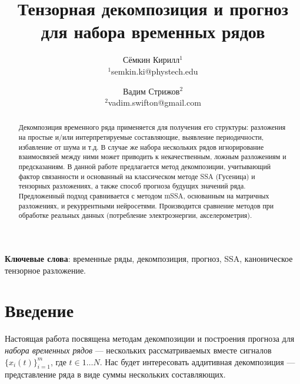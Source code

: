 
\usepackage[backend=biber, sorting=none]{biblatex}
\usepackage{subfigure}



\theoremstyle{definition}
\newtheorem*{Def}{Определение}
\theoremstyle{plain}
\newtheorem{Lem}{Лемма}
\newtheorem{Th}{Теорема}

\newcommand{\delayV}[1]{\overset{\leftarrow}{\mathbf{x}}_{#1}}
\newcommand{\delayM}[1]{\overset{\leftarrow}{\mathbf{X}}_{#1}}

\title{Тензорная декомпозиция и прогноз для набора временных рядов}
\author{Сёмкин Кирилл$^{1}$ \\ {\footnotesize $^{1}$semkin.ki@phystech.edu} \and Вадим Стрижов$^{2}$ \\ {\footnotesize $^{2}$vadim.swifton@gmail.com}}
\date{}



	
	\maketitle
	
	\begin{abstract}
		
		Декомпозиция временного ряда применяется для получения его структуры: разложения на простые и/или интерпретируемые составляющие, выявление периодичности, избавление от шума и т.д. В случае же набора нескольких рядов игнорирование взаимосвязей между ними может приводить к некачественным, ложным разложениям и предсказаниям. В данной работе предлагается метод декомпозиции, учитывающий фактор связанности и основанный на классическом методе SSA (Гусеница) и тензорных разложениях, а также способ прогноза будущих значений ряда. Предложенный подход сравнивается с методом mSSA, основанным на матричных разложениях, и рекуррентными нейросетями. Производится сравнение методов при обработке реальных данных (потребление электроэнергии, акселерометрия).
		
	\end{abstract}
	
	\textbf{Ключевые слова}: {\small временные ряды, декомпозиция, прогноз, SSA, каноническое тензорное разложение}.
	
	
	\section{Введение}\label{Intro}
	
		Настоящая работа посвящена методам декомпозиции и построения прогноза для \textit{набора временных рядов} --- нескольких рассматриваемых вместе сигналов $ \{x_i(t)\}_{i=1}^m $, где $ t \in 1 \ldots N $. Нас будет интересовать аддитивная декомпозиция --- представление ряда в виде суммы нескольких составляющих.
		
